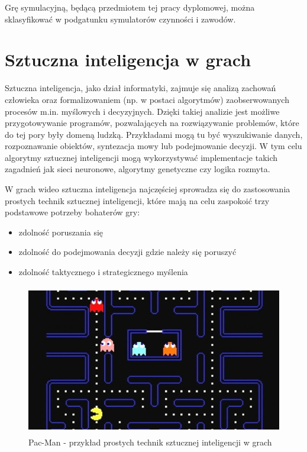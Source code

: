 Grę symulacyjną, będącą przedmiotem tej pracy dyplomowej, można sklasyfikować w podgatunku symulatorów czynności i zawodów.

\section{Sztuczna inteligencja w grach}
Sztuczna inteligencja, jako dział informatyki, zajmuje się analizą zachowań człowieka oraz formalizowaniem (np. w postaci algorytmów) zaobserwowanych procesów m.in. myślowych i decyzyjnych. Dzięki takiej analizie jest możliwe przygotowywanie programów, pozwalających na rozwiązywanie problemów, które do tej pory były domeną ludzką. Przykładami mogą tu być wyszukiwanie danych, rozpoznawanie obiektów, syntezacja mowy lub podejmowanie decyzji. W tym celu algorytmy sztucznej inteligencji mogą wykorzystywać implementacje takich zagadnień jak sieci neuronowe, algorytmy genetyczne czy logika rozmyta.

W grach wideo sztuczna inteligencja najczęściej sprowadza się do zastosowania prostych technik sztucznej inteligencji, które mają na celu zaspokoić trzy podstawowe potrzeby bohaterów gry\cite{aiForGames}:
\begin{itemize}
	\item zdolność poruszania się 
	\item zdolność do podejmowania decyzji gdzie należy się poruszyć
	\item zdolność taktycznego i strategicznego myślenia
\end{itemize}

\begin{figure}
\begin{center}
	\includegraphics[width=120mm,height=66mm]{images/pacman}
	\caption{Pac-Man - przykład prostych technik sztucznej inteligencji w grach\label{pacman}}
\end{center}
\end{figure}

